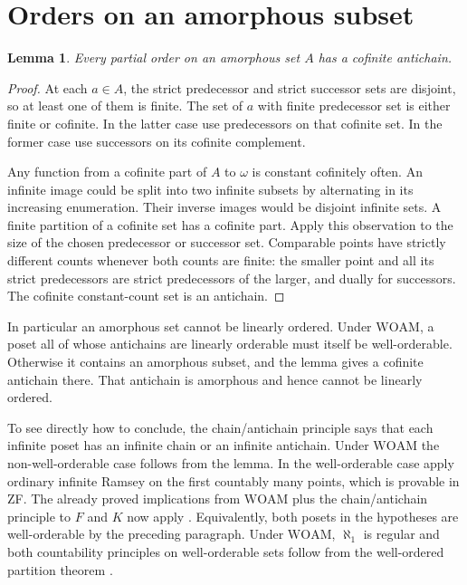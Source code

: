 \documentclass[11pt]{article}
\newtheorem{lemma}[theorem]{Lemma}
\begin{document}
\section{Orders on an amorphous subset}
\begin{lemma}
Every partial order on an amorphous set $A$ has a cofinite antichain.
\end{lemma}
\begin{proof}
At each $a\in A$, the strict predecessor and strict successor sets are disjoint, so at least one of them is finite. The set of $a$ with finite predecessor set is either finite or cofinite. In the latter case use predecessors on that cofinite set. In the former case use successors on its cofinite complement.

Any function from a cofinite part of $A$ to $\omega$ is constant cofinitely often. An infinite image could be split into two infinite subsets by alternating in its increasing enumeration. Their inverse images would be disjoint infinite sets. A finite partition of a cofinite set has a cofinite part. Apply this observation to the size of the chosen predecessor or successor set. Comparable points have strictly different counts whenever both counts are finite: the smaller point and all its strict predecessors are strict predecessors of the larger, and dually for successors. The cofinite constant-count set is an antichain.
\end{proof}
In particular an amorphous set cannot be linearly ordered. Under $\mathrm{WOAM}$, a poset all of whose antichains are linearly orderable must itself be well-orderable. Otherwise it contains an amorphous subset, and the lemma gives a cofinite antichain there. That antichain is amorphous and hence cannot be linearly ordered.

To see directly how to conclude, the chain/antichain principle says that each infinite poset has an infinite chain or an infinite antichain. Under $\mathrm{WOAM}$ the non-well-orderable case follows from the lemma. In the well-orderable case apply ordinary infinite Ramsey on the first countably many points, which is provable in ZF. The already proved implications from $\mathrm{WOAM}$ plus the chain/antichain principle to $F$ and $K$ now apply \cite[Theorem 4.2(1) and Fact 3.1(4)]{bg}. Equivalently, both posets in the hypotheses are well-orderable by the preceding paragraph. Under $\mathrm{WOAM}$, $\aleph_1$ is regular and both countability principles on well-orderable sets follow from the well-ordered partition theorem \cite[Fact 3.1(2) and Proposition 3.3]{bg}.
\end{document}
